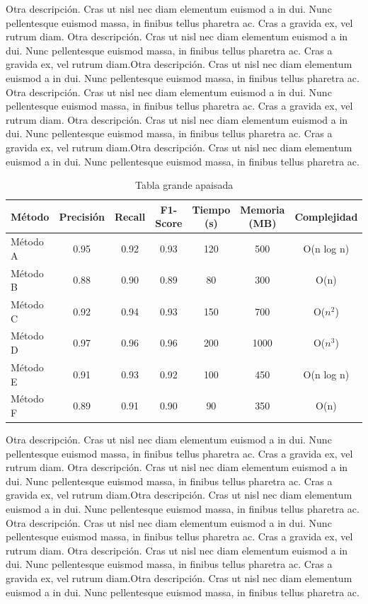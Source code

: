 \documentclass[b5paper, 10pt]{book}
\begin{document}
Otra descripción. Cras ut nisl nec diam elementum euismod a in dui. Nunc pellentesque euismod massa, in finibus tellus pharetra ac. Cras a gravida ex, vel rutrum diam. Otra descripción. Cras ut nisl nec diam elementum euismod a in dui. Nunc pellentesque euismod massa, in finibus tellus pharetra ac. Cras a gravida ex, vel rutrum diam.Otra descripción. Cras ut nisl nec diam elementum euismod a in dui. Nunc pellentesque euismod massa, in finibus tellus pharetra ac.
Otra descripción. Cras ut nisl nec diam elementum euismod a in dui. Nunc pellentesque euismod massa, in finibus tellus pharetra ac. Cras a gravida ex, vel rutrum diam. Otra descripción. Cras ut nisl nec diam elementum euismod a in dui. Nunc pellentesque euismod massa, in finibus tellus pharetra ac. Cras a gravida ex, vel rutrum diam.Otra descripción. Cras ut nisl nec diam elementum euismod a in dui. Nunc pellentesque euismod massa, in finibus tellus pharetra ac.
\begin{landscape}
	\begin{table}
		\centering
		\caption{Tabla grande apaisada}
		\label{tab:apaisada}
		\begin{tabular}{l*{6}{c}}
			\toprule
			Método & Precisión & Recall & F1-Score & Tiempo (s) & Memoria (MB) & Complejidad \\
			\midrule
			Método A & 0.95 & 0.92 & 0.93 & 120 & 500 & O(n log n) \\
			Método B & 0.88 & 0.90 & 0.89 & 80 & 300 & O(n) \\
			Método C & 0.92 & 0.94 & 0.93 & 150 & 700 & O($n^2$) \\
			Método D & 0.97 & 0.96 & 0.96 & 200 & 1000 & O($n^3$) \\
			Método E & 0.91 & 0.93 & 0.92 & 100 & 450 & O(n log n) \\
			Método F & 0.89 & 0.91 & 0.90 & 90 & 350 & O(n) \\
			\bottomrule
		\end{tabular}
	\end{table}
\end{landscape}
Otra descripción. Cras ut nisl nec diam elementum euismod a in dui. Nunc pellentesque euismod massa, in finibus tellus pharetra ac. Cras a gravida ex, vel rutrum diam. Otra descripción. Cras ut nisl nec diam elementum euismod a in dui. Nunc pellentesque euismod massa, in finibus tellus pharetra ac. Cras a gravida ex, vel rutrum diam.Otra descripción. Cras ut nisl nec diam elementum euismod a in dui. Nunc pellentesque euismod massa, in finibus tellus pharetra ac.
Otra descripción. Cras ut nisl nec diam elementum euismod a in dui. Nunc pellentesque euismod massa, in finibus tellus pharetra ac. Cras a gravida ex, vel rutrum diam. Otra descripción. Cras ut nisl nec diam elementum euismod a in dui. Nunc pellentesque euismod massa, in finibus tellus pharetra ac. Cras a gravida ex, vel rutrum diam.Otra descripción. Cras ut nisl nec diam elementum euismod a in dui. Nunc pellentesque euismod massa, in finibus tellus pharetra ac.
\end{document}
